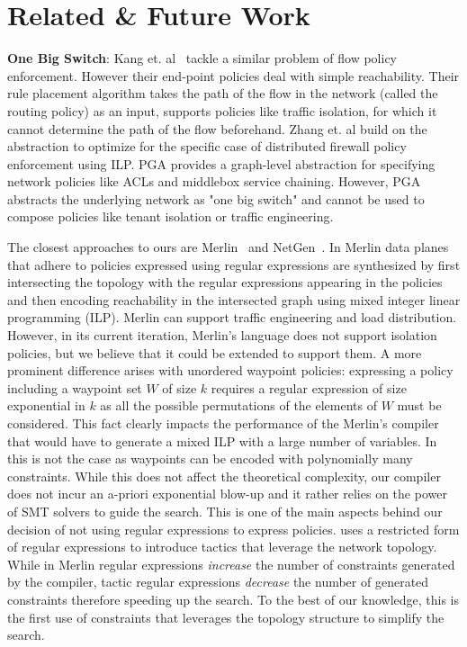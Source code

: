 \section{Related \& Future Work} \label{sec:relatedwork}
\textbf{One Big Switch}: Kang et. al~\cite{oneswitch} tackle a 
similar problem of flow policy
enforcement. However their end-point policies deal with simple
reachability. Their rule placement algorithm takes the path of the
flow in the network  (called the routing policy) as an input,%
\Name supports policies like traffic isolation, 
for which it cannot determine the path of the flow
beforehand. %
Zhang et. al \cite{distfirewall} build on the
\cite{oneswitch} abstraction to optimize for the specific case of
distributed firewall policy enforcement using ILP.  PGA \cite{pga} provides
a graph-level abstraction for specifying network policies like ACLs and
middlebox service chaining. However, PGA abstracts the underlying
network as "one big switch" and cannot be used to compose policies like
tenant isolation or traffic engineering.

The closest approaches to ours are Merlin~\cite{merlin} and
NetGen~\cite{netgen}.  In Merlin data planes that adhere to policies
expressed using regular expressions are synthesized by first
intersecting the topology with the regular expressions appearing in
the policies and then encoding reachability in the intersected graph
using mixed integer linear programming (ILP).
Merlin can support traffic engineering and load distribution. 
However, in its current iteration, 
Merlin's language does not support isolation policies, but we believe
that it could be extended to support them.  
A more prominent
difference arises with unordered waypoint policies: expressing a
policy including a waypoint set $W$ of size $k$ requires a regular
expression of size exponential in $k$ as all the possible permutations
of the elements of $W$ must be considered. This fact clearly impacts the performance of
the Merlin's compiler that would have to generate a mixed ILP with a
large number of variables.  In \Name this is not the case as waypoints
can be encoded with polynomially many constraints.  While this does
not affect the theoretical complexity, our compiler does not incur
an a-priori exponential blow-up and it rather relies on the power
of SMT solvers to guide the search.  This is one of the main aspects
behind our decision of not using regular expressions to express
policies.  \Name uses a restricted form of regular expressions to
introduce tactics that leverage the network topology.  While in Merlin
regular expressions \emph{increase} the number of constraints
generated by the compiler, tactic regular expressions \emph{decrease}
the number of generated constraints therefore speeding up the search.
To the best of our knowledge, this is the first use of constraints
that leverages the topology structure to simplify the search.

